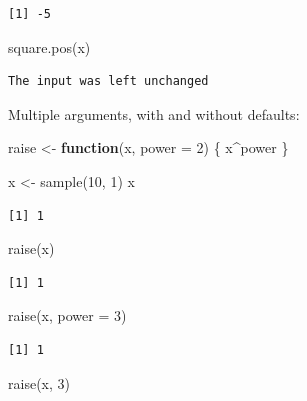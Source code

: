 \documentclass[
]{book}
\newenvironment{Shaded}{\begin{snugshade}}{\end{snugshade}}
\newcommand{\AttributeTok}[1]{\textcolor[rgb]{0.77,0.63,0.00}{#1}}
\newcommand{\ControlFlowTok}[1]{\textcolor[rgb]{0.13,0.29,0.53}{\textbf{#1}}}
\newcommand{\DecValTok}[1]{\textcolor[rgb]{0.00,0.00,0.81}{#1}}
\newcommand{\FunctionTok}[1]{\textcolor[rgb]{0.00,0.00,0.00}{#1}}
\newcommand{\NormalTok}[1]{#1}
\newcommand{\OtherTok}[1]{\textcolor[rgb]{0.56,0.35,0.01}{#1}}
\newcommand{\SpecialCharTok}[1]{\textcolor[rgb]{0.00,0.00,0.00}{#1}}
\begin{document}
\begin{verbatim}
[1] -5
\end{verbatim}

\begin{Shaded}
\begin{Highlighting}[]
\FunctionTok{square.pos}\NormalTok{(x)}
\end{Highlighting}
\end{Shaded}

\begin{verbatim}
The input was left unchanged
\end{verbatim}

Multiple arguments, with and without defaults:

\begin{Shaded}
\begin{Highlighting}[]
\NormalTok{raise }\OtherTok{\textless{}{-}} \ControlFlowTok{function}\NormalTok{(x, }\AttributeTok{power =} \DecValTok{2}\NormalTok{) \{}
\NormalTok{  x}\SpecialCharTok{\^{}}\NormalTok{power}
\NormalTok{\}}

\NormalTok{x }\OtherTok{\textless{}{-}} \FunctionTok{sample}\NormalTok{(}\DecValTok{10}\NormalTok{, }\DecValTok{1}\NormalTok{)}
\NormalTok{x}
\end{Highlighting}
\end{Shaded}

\begin{verbatim}
[1] 1
\end{verbatim}

\begin{Shaded}
\begin{Highlighting}[]
\FunctionTok{raise}\NormalTok{(x)}
\end{Highlighting}
\end{Shaded}

\begin{verbatim}
[1] 1
\end{verbatim}

\begin{Shaded}
\begin{Highlighting}[]
\FunctionTok{raise}\NormalTok{(x, }\AttributeTok{power =} \DecValTok{3}\NormalTok{)}
\end{Highlighting}
\end{Shaded}

\begin{verbatim}
[1] 1
\end{verbatim}

\begin{Shaded}
\begin{Highlighting}[]
\FunctionTok{raise}\NormalTok{(x, }\DecValTok{3}\NormalTok{)}
\end{Highlighting}
\end{Shaded}
\end{document}
